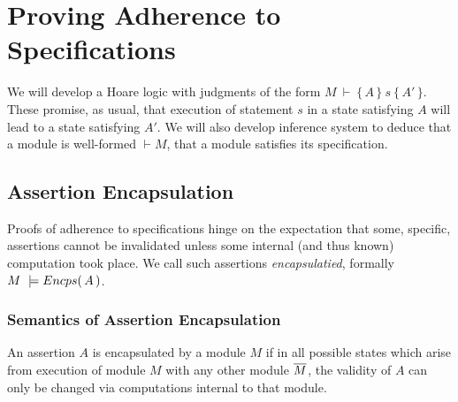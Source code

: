 \newcommand{\extract}[1]{\ensuremath{{\mathcal I}\!nvs(#1)}}
\newcommand{\specs}[1]{\ensuremath{Specs(#1)}}%


\section{Proving Adherence to \SpecLang Specifications}


We will develop a  Hoare logic with judgments of the form  $M\ \vdash\  \{\, A \,  \}\ s\  \{\, A' \, \}$. These promise, as usual, that execution of statement $s$ in a state satisfying $A$ will lead to a state satisfying $A'$. We will also develop inference system to deduce that a module is well-formed $\vdash M$, \ie that a module satisfies its specification.

\subsection {Assertion Encapsulation}
\label{s:encaps-proof}

{
Proofs of adherence to {\SpecLang specifications  hinge on the expectation that some, 
specific, assertions cannot be invalidated unless some 
} internal (and thus known) computation took place. 
{We call such assertions   \emph{encapsulatied},}
}
formally $M\ \models  {\ensuremath Encps(\, A\, )}$.
 

\subsubsection{Semantics of Assertion Encapsulation}

{An assertion $A$  is  encapsulated by a module $M$  if in all possible states which arise from execution of module $M$ with any other  module $\overline{M}$, the validity of $A$}  {can only be changed via computations internal to that module}.
 

